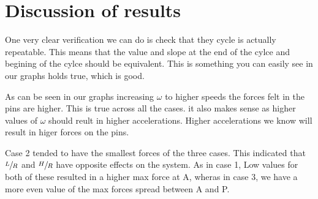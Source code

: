 \documentclass[nofoot,pdf-a,balance,colorlinks,upint,subscriptcorrection,varvw,mathalfa=cal=boondoxo]{asmeconf}
\begin{document}
\begin{table}[H]
        \caption[Table]{Max forces at P}\label{tab:pForce}
    \end{table}

	\section{Discussion of results}
	One very clear verification we can do is check that they cycle is actually repeatable. This means that the value and slope at the end of the cylce and begining of the cylce should be equivalent. This is something you can easily see in our graphs holds true, which is good. 


	As can be seen in our graphs increasing $\omega$ to higher speeds the forces felt in the pins are higher. This is true across all the cases. it also makes sense as higher values of $\omega$ should reult in higher accelerations. Higher accelerations we know will result in higer forces on the pins.

	Case 2 tended to have the smallest forces of the three cases. This indicated that $\sfrac{L}{R}$ and $\sfrac{H}{R}$ have opposite effects on the system. As in case 1, Low values for both of these resulted in a higher max force at A, wheras in case 3, we have a more even value of the max forces spread between A and P.
\end{document}
